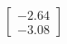 \documentclass[preview]{standalone}
\begin{document}
\begin{align*}
\begin{bmatrix} -2.64 \\ -3.08 \end{bmatrix}
\end{align*}
\end{document}
